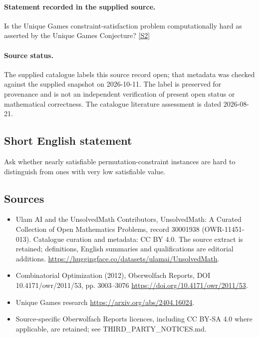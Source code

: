 \documentclass[11pt]{article}
\begin{document}
\paragraph{Statement recorded in the supplied source.}
Is the Unique Games constraint-satisfaction problem computationally hard as asserted by the Unique Games Conjecture? \href{https://doi.org/10.4171/owr/2011/53}{[S2]}
\paragraph{Source status.}
The supplied catalogue labels this source record open; that metadata was checked against the supplied snapshot on 2026-10-11. The label is preserved for provenance and is not an independent verification of present open status or mathematical correctness. The catalogue literature assessment is dated 2026-08-21.
\subsection{Short English statement}
Ask whether nearly satisfiable permutation-constraint instances are hard to distinguish from ones with very low satisfiable value.
\subsection{Sources}
\begin{itemize}
\item[S1] Ulam AI and the UnsolvedMath Contributors, UnsolvedMath: A Curated Collection of Open Mathematics Problems, record 30001938 (OWR-11451-013). Catalogue curation and metadata: CC BY 4.0. The source extract is retained; definitions, English summaries and qualifications are editorial additions.
\url{https://huggingface.co/datasets/ulamai/UnsolvedMath}.
\item[S2] Combinatorial Optimization (2012), Oberwolfach Reports, DOI 10.4171/owr/2011/53, pp. 3003--3076
\url{https://doi.org/10.4171/owr/2011/53}.
\item[S3] Unique Games research
\url{https://arxiv.org/abs/2404.16024}.
\item Source-specific Oberwolfach Reports licences, including CC BY-SA 4.0 where applicable, are retained; see THIRD\_PARTY\_NOTICES.md.
\end{itemize}
\end{document}
